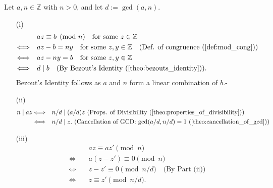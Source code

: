 \begin{Proof}
    Let \(a, n \in \mathbb{Z}\) with \(n > 0\), and let \(d := \gcd(a, n)\).
   \begin{itemize}
    \item [(i)] 
    \begin{align*}
        &az \equiv b \pmod{n} \quad \text{for some } z \in \mathbb{Z} \\
        \Longleftrightarrow \quad &az - b = ny \quad \text{for some } z, y \in \mathbb{Z} \quad \text{(Def. of congruence (\ref{def:mod_cong}))} \\
        \Longleftrightarrow \quad &az - ny = b \quad \text{for some } z, y \in \mathbb{Z} \\
        \Longleftrightarrow \quad &d \mid b \quad \text{(By Bezout's Identity (\ref{theo:bezouts_identity}))}.
        \end{align*}
        Bezout's Identity follows as $a$ and $n$ form a linear combination of $b$.-
    \item [(ii)] 
    \begin{align*}
        n \mid az \Longleftrightarrow \quad & n/d \mid (a/d)z  \text{ (Props. of Divisibility (\ref{theo:properties_of_divisibility}))}\\
        \Longleftrightarrow \quad & n/d \mid z.  \text{ (Cancellation of GCD: $\gcd(a/d,n/d)=1$ (\ref{theo:cancellation_of_gcd}))}
    \end{align*}


    \item [(iii)]
    \begin{align*}
        &az \equiv az' \pmod{n} \\
        \Longleftrightarrow \quad & a(z - z') \equiv 0 \pmod{n} \\
        \Longleftrightarrow \quad & z - z' \equiv 0 \pmod{n/d} \quad \text{(By Part (ii))} \\
        \Longleftrightarrow \quad & z \equiv z' \pmod{n/d}.
        \end{align*}
        

   \end{itemize}
\end{Proof}








